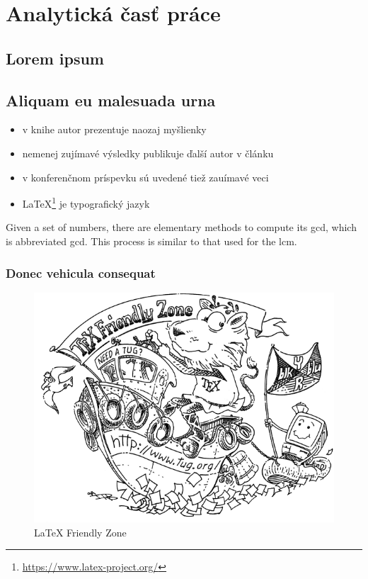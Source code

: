 
\chapter{Analytická časť práce}
\label{analyza}

\section{Lorem ipsum}
\Blindtext
\blinditemize

\section{Aliquam eu malesuada urna}
\blindtext
\begin{itemize}
    \item v knihe \cite{book} autor prezentuje naozaj myšlienky
    \item nemenej zujímavé výsledky publikuje ďalší autor v článku \cite{article} 
    \item v konferenčnom príspevku \cite{conference} sú uvedené tiež zauímavé veci
    \item \LaTeX{}\footnote{\url{https://www.latex-project.org/}} je typografický jazyk
\end{itemize}

Given a set of numbers, there are elementary methods to compute its \acrlong{gcd}, which is abbreviated \acrshort{gcd}. This process is similar to that used for the \acrfull{lcm}.

\subsection{Donec vehicula consequat}
\blindtext

\begin{figure}[!ht]
    \centering
    \includegraphics[width=.9\textwidth]{figures/tugboat}
    \caption{\LaTeX{} Friendly Zone \label{o:latex_friendly_zone}}
\end{figure}

